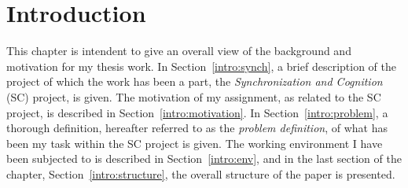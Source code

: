 
\cleardoublepage
\chapter{Introduction}
\label{intro}

This chapter is intendent to give an overall view of the background
and motivation for my thesis work.  In Section~\ref{intro:synch}, a
brief description of the project of which the work has been a part,
the {\em Synchronization and Cognition\/} (SC) project, is given.  The
motivation of my assignment, as related to the SC project, is
described in Section~\ref{intro:motivation}.  In
Section~\ref{intro:problem}, a thorough definition, hereafter referred
to as the {\em problem definition\/}, of what has been my task within
the SC project is given.  The working environment I have been
subjected to is described in Section~\ref{intro:env}, and in the last
section of the chapter, Section~\ref{intro:structure}, the overall
structure of the paper is presented.






